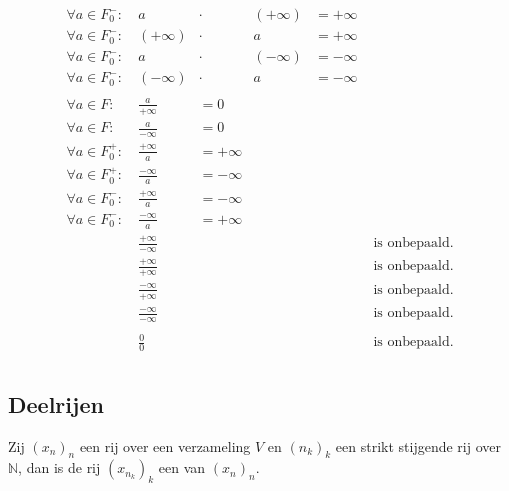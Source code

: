 \documentclass[main.tex]{subfiles}
\begin{document}
\begin{st}
\[\begin{array}{rccccl}
    \forall a \in F_{0}^{-}:\ & a         &\cdot& (+\infty) &= + \infty \\
    \forall a \in F_{0}^{-}:\ & (+\infty) &\cdot& a         &= + \infty \\
    \forall a \in F_{0}^{-}:\ & a         &\cdot& (-\infty) &= - \infty \\
    \forall a \in F_{0}^{-}:\ & (-\infty) &\cdot& a         &= - \infty \\\\

    \forall a \in F:\        & \frac{a}{+\infty}      &= 0 \\
    \forall a \in F:\        & \frac{a}{-\infty}      &= 0 \\
    \forall a \in F_{0}^{+}:\ & \frac{+\infty}{a}      &= +\infty \\
    \forall a \in F_{0}^{+}:\ & \frac{-\infty}{a}      &= -\infty \\
    \forall a \in F_{0}^{-}:\ & \frac{+\infty}{a}      &= -\infty \\
    \forall a \in F_{0}^{-}:\ & \frac{-\infty}{a}      &= +\infty \\
                             & \frac{+\infty}{-\infty} &&&& \text{ is onbepaald.}\\
                             & \frac{+\infty}{+\infty} &&&& \text{ is onbepaald.}\\
                             & \frac{-\infty}{+\infty} &&&& \text{ is onbepaald.}\\
                             & \frac{-\infty}{-\infty} &&&& \text{ is onbepaald.}\\\\
                             & \frac{0}{0}             &&&& \text{ is onbepaald.}\\
  \end{array}
  \]
\end{st}

\subsection{Deelrijen}
\label{sec:deelrijen}

\begin{de}
  Zij $(x_{n})_{n}$ een rij over een verzameling $V$ en $(n_{k})_{k}$ een strikt stijgende rij over $\mathbb{N}$, dan is de rij $(x_{n_{k}})_{k}$ een  van $(x_{n})_{n}$.
\end{de}
\end{document}
